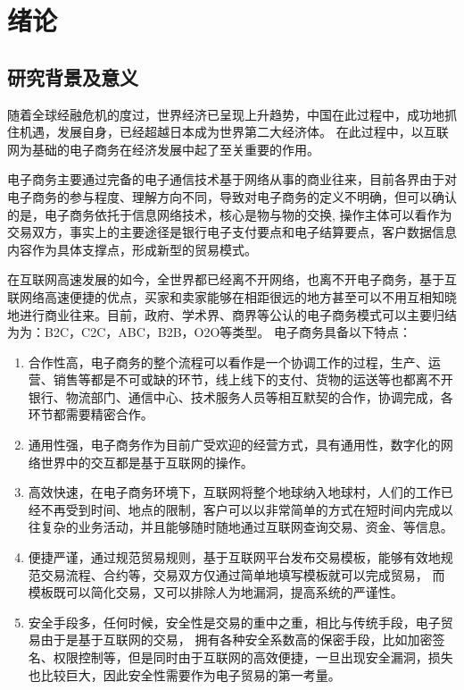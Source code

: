 \chapter{绪论}
\section{研究背景及意义}
随着全球经融危机的度过，世界经济已呈现上升趋势，中国在此过程中，成功地抓住机遇，发展自身，已经超越日本成为世界第二大经济体。
在此过程中，以互联网为基础的电子商务在经济发展中起了至关重要的作用。

电子商务主要通过完备的电子通信技术基于网络从事的商业往来，目前各界由于对电子商务的参与程度、理解方向不同，导致对电子商务的定义不明确，但可以确认的是，电子商务依托于信息网络技术，核心是物与物的交换,
操作主体可以看作为交易双方，事实上的主要途径是银行电子支付要点和电子结算要点，客户数据信息内容作为具体支撑点，形成新型的贸易模式。

在互联网高速发展的如今，全世界都已经离不开网络，也离不开电子商务，基于互联网络高速便捷的优点，买家和卖家能够在相距很远的地方甚至可以不用互相知晓地进行商业往来。目前，政府、学术界、商界等公认的电子商务模式可以主要归结为为：B2C，C2C，ABC，B2B，O2O等类型。
电子商务具备以下特点：
\begin{enumerate}[(1)]
\setlength{\itemsep}{0ex}
\item 合作性高，电子商务的整个流程可以看作是一个协调工作的过程，生产、运营、销售等都是不可或缺的环节，线上线下的支付、货物的运送等也都离不开银行、物流部门、通信中心、技术服务人员等相互默契的合作，协调完成，各环节都需要精密合作。
\item 通用性强，电子商务作为目前广受欢迎的经营方式，具有通用性，数字化的网络世界中的交互都是基于互联网的操作。
\item 高效快速，在电子商务环境下，互联网将整个地球纳入地球村，人们的工作已经不再受到时间、地点的限制，客户可以以非常简单的方式在短时间内完成以往复杂的业务活动，并且能够随时随地通过互联网查询交易、资金、等信息。
\item 便捷严谨，通过规范贸易规则，基于互联网平台发布交易模板，能够有效地规范交易流程、合约等，交易双方仅通过简单地填写模板就可以完成贸易，
而模板既可以简化交易，又可以排除人为地漏洞，提高系统的严谨性。
\item 安全手段多，任何时候，安全性是交易的重中之重，相比与传统手段，电子贸易由于是基于互联网的交易，
拥有各种安全系数高的保密手段，比如加密签名、权限控制等，但是同时由于互联网的高效便捷，一旦出现安全漏洞，损失也比较巨大，因此安全性需要作为电子贸易的第一考量。
\end{enumerate}

